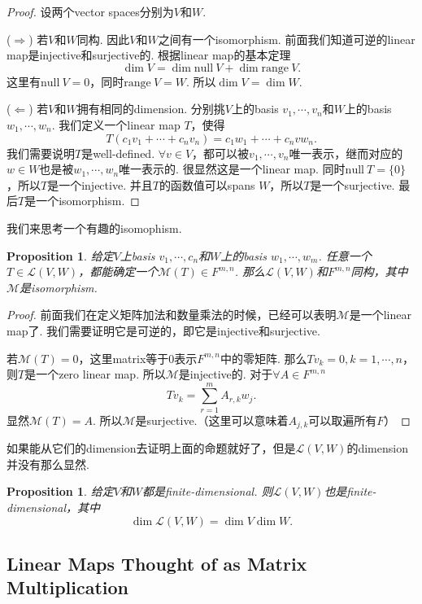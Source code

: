 \documentclass{article}
\newtheorem{proposition}[theorem]{Proposition}
\newcommand\nul[1]{\text{null}\ #1}
\newcommand\range[1]{\text{range}\ #1}
\begin{document}
\begin{proof}
设两个vector spaces分别为$V$和$W$.

($\Rightarrow$) 若$V$和$W$同构. 因此$V$和$W$之间有一个isomorphism. 前面我们知道可逆的linear map是injective和surjective的. 根据linear map的基本定理
$$
	\dim V = \dim\nul{V} + \dim\range{V}.
$$
这里有$\nul{V} =  0$，同时$\range{V} =  W$. 所以$\dim V  = \dim W$.

($\Leftarrow$) 若$V$和$W$拥有相同的dimension. 分别挑$V$上的basis $v_1,\cdots,v_n$和$W$上的basis $w_1,\cdots,w_n$. 我们定义一个linear map $T$，使得
$$
	T(c_1v_1 + \cdots + c_nv_n) =  c_1w_1 + \cdots + c_nvw_n.
$$
我们需要说明$T$是well-defined. $\forall v \in V$，都可以被$v_1,\cdots,v_n$唯一表示，继而对应的$w \in W$也是被$w_1,\cdots,w_n$唯一表示的. 很显然这是一个linear map. 同时$\nul{T} = \{0\}$，所以$T$是一个injective. 并且$T$的函数值可以spans $W$，所以$T$是一个surjective. 最后$T$是一个isomorphism.
\end{proof}

{\color{red} 我们来思考一个有趣的isomophism}.

\begin{proposition}
\rm 给定$V$上basis $v_1,\cdots,c_n$和$W$上的basis $w_1,\cdots,w_m$. 任意一个$T \in \mathcal{L}(V,W)$，都能确定一个$\mathcal{M}(T) \in F^{m,n}$. 那么$\mathcal{L}(V,W)$和$F^{m,n}$同构，其中$\mathcal{M}$是isomorphism.
\end{proposition}

\begin{proof}
前面我们在定义矩阵加法和数量乘法的时候，已经可以表明$\mathcal{M}$是一个linear map了. 我们需要证明它是可逆的，即它是injective和surjective.

若$\mathcal{M}(T) = 0$，这里matrix等于0表示$F^{m,n}$中的零矩阵. 那么$Tv_k = 0,k = 1,\cdots,n$，则$T$是一个zero linear map. 所以$\mathcal{M}$是injective的. 对于$\forall A \in F^{m,n}$
$$
	Tv_k  = \sum\limits_{r=1}^{m}A_{r,k}w_j.
$$ 
显然$\mathcal{M}(T)=A$. 所以$\mathcal{M}$是surjective.（这里可以意味着$A_{j,k}$可以取遍所有$F$） 
\end{proof}

{\color{red} 如果能从它们的dimension去证明上面的命题就好了，但是$\mathcal{L}(V,W)$的dimension并没有那么显然}.

\begin{proposition}
\rm 给定$V$和$W$都是finite-dimensional. 则$\mathcal{L}(V,W)$也是finite-dimensional，其中
$$
\dim \mathcal{L}(V,W) = \dim V \dim W.
$$
\end{proposition}

\newpage
\subsection{Linear Maps Thought of as Matrix Multiplication}
\end{document}
